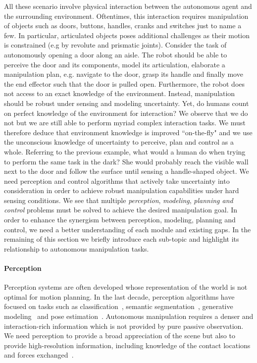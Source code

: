 \medskip
All these scenario involve physical interaction between the autonomous agent and the surrounding environment. Oftentimes, this interaction requires manipulation of objects such as doors, buttons, handles, cranks and switches just to name a few. In particular, articulated objects poses additional challenges as their motion is constrained (e.g by revolute and prismatic joints). Consider the task of autonomously opening a door along an aisle. The robot should be able to perceive the door and its components, model its articulation, elaborate a manipulation plan, e.g. navigate to the door, grasp its handle and finally move the end effector such that the door is pulled open. Furthermore, the robot does not access to an exact knowledge of the environment. Instead, manipulation should be robust under sensing and modeling uncertainty. Yet, do humans count on perfect knowledge of the environment for interaction? We observe that we do not but we are still able to perform myriad complex interaction tasks. We must therefore deduce that environment knowledge is improved ``on-the-fly" and we use the unconscious knowledge of uncertainty to perceive, plan and control as a whole. Referring to the previous example, what would a human do when trying to perform the same task in the dark? She would probably reach the visible wall next to the door and follow the surface until sensing a handle-shaped object. We need perception and control algorithms that actively take uncertainty into consideration in order to achieve robust manipulation capabilities under hard sensing conditions.   
We see that multiple \emph{perception}, \emph{modeling}, \emph{planning and control} problems must be solved to achieve the desired manipulation goal. In order to enhance the synergism between perception, modeling, planning and control, we need a better understanding of each module and existing gaps. In the remaining of this section we briefly introduce each sub-topic and highlight its relationship to autonomous manipulation tasks. 


\paragraph{Perception} Perception systems are often developed whose representation of the world is not optimal for motion planning. In the last decade, perception algorithms have focused on tasks such as classification~\citep{redmon2016you}, semantic segmentation~\cite{badrinarayanan2017segnet}, generative modeling~\citep{karras2019stylebased} and pose estimation~\cite{xiang2017posecnn}. Autonomous manipulation requires a denser and interaction-rich information which is not provided by pure passive observation. We need perception to provide a broad appreciation of the scene but also to provide high-resolution information, including knowledge of the contact locations and forces exchanged~\cite{mason2018toward}. 

